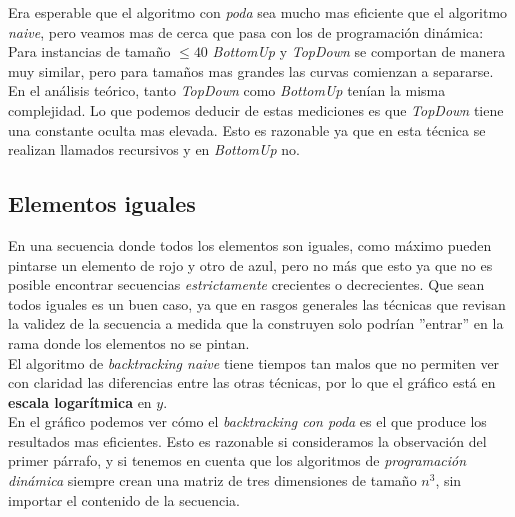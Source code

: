 Era esperable que el algoritmo con \textit{poda} sea mucho mas eficiente que el algoritmo \textit{naive}, pero veamos mas de cerca que pasa con los de programación dinámica: \\


Para instancias de tamaño $\leq 40$ \textit{BottomUp} y \textit{TopDown} se comportan de manera muy similar, pero para tamaños mas grandes las curvas comienzan a separarse. \\

En el análisis teórico, tanto \textit{TopDown} como \textit{BottomUp} tenían la misma complejidad. Lo que podemos deducir de estas mediciones es que \textit{TopDown} tiene una constante oculta mas elevada. Esto es razonable ya que en esta técnica se realizan llamados recursivos y en \textit{BottomUp} no. 

\subsection{Elementos iguales}

En una secuencia donde todos los elementos son iguales, como máximo pueden pintarse un elemento de rojo y otro de azul, pero no más que esto ya que no es posible encontrar secuencias \textit{estrictamente} crecientes o decrecientes. Que sean todos iguales es un buen caso, ya que en rasgos generales las técnicas que revisan la validez de la secuencia a medida que la construyen solo podrían ''entrar'' en la rama donde los elementos no se pintan. \\

El algoritmo de \textit{backtracking naive} tiene tiempos tan malos que no permiten ver con claridad las diferencias entre las otras técnicas, por lo que el gráfico está en \textbf{escala logarítmica} en $y$.\\

En el gráfico podemos ver cómo el \textit{backtracking con poda} es el que produce los resultados mas eficientes. Esto es razonable si consideramos la observación del primer párrafo, y si tenemos en cuenta que los algoritmos de \textit{programación dinámica} siempre crean una matriz de tres dimensiones de tamaño $n^3$, sin importar el contenido de la secuencia. \\


